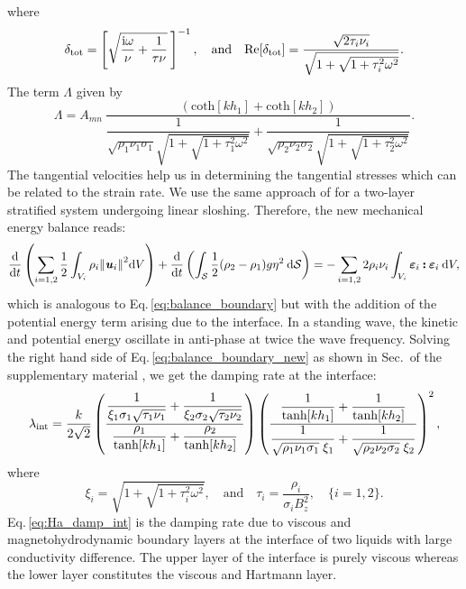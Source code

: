 \documentclass[aps,prfluids,reprint,superscriptaddress]{revtex4-2}
\newcommand{\h}[1]{\textbf{\textit{#1}}}
\newcommand{\ii}[1]{\text{#1}}
\newcommand{\RN}[1]{%
	\textup{\uppercase\expandafter{\romannumeral#1}}%
}
\begin{document}
where
\begin{equation}
	\delta_{\rm tot}=
	\left[
	\sqrt{\dfrac{\ii i\omega}{\nu} + \dfrac{1}{\tau\nu} }
	\:\right]^{-1},
	\quad  \ii{and}  \quad
	\ii{Re}[\delta_{\rm tot}] 
	=
	\frac{\sqrt{2\tau_i\nu_i}}{\sqrt{1+\sqrt{1+\tau_i^2\omega^2}}}.
\end{equation}
The term $\Lambda$ given by
\begin{equation}
	\Lambda = A_{mn}\:\frac{(\text{coth}[kh_1] + \text{coth}[kh_2]) }
	{
		\dfrac{1}{\sqrt{\rho_1\nu_1\sigma_1}
			\sqrt{1 + \sqrt{1 + \tau_1^2\omega^2} }  }
		+
		\dfrac{1}{\sqrt{\rho_2\nu_2\sigma_2}
			\sqrt{1 + \sqrt{1 + \tau_2^2\omega^2} }  }
	}.
\end{equation}
\indent The tangential velocities help us in determining the tangential stresses which can be related to the strain rate. We use the same approach of \citet{Hegde2026} for a two-layer stratified system undergoing linear sloshing. Therefore, the new mechanical energy balance reads:
\begin{equation}
	\dv{}{t}\left( \sum_{i=1,2} \frac{1}{2} 
	\int_{V_i} \rho_i \norm{\h u_i}^2 \mathrm dV  \right)
	+
	\dv{}{t}\left( \int_{\mathcal{S}} 
	\frac{1}{2} (\rho_2-\rho_1)g\eta^2  \: \mathrm d\mathcal{S}  
	\right)
	= -\sum_{i=1,2} 2\rho_i\nu_i
	\int_{V_i} \bm\varepsilon_i \bm{\mathbin{:}} \bm\varepsilon_i  \: \mathrm dV ,
	\label{eq:balance_boundary_new}
\end{equation}
which is analogous to Eq.\,\eqref{eq:balance_boundary} but with the addition of the potential energy term  arising due to the interface. In a standing wave, the kinetic and potential energy oscillate in anti-phase at twice the wave frequency. Solving the right hand side of Eq.\,\eqref{eq:balance_boundary_new} as shown in Sec.\,\RN{3} of the supplementary material \cite{SMmagdamp_hegde}, we get the damping rate at the interface:
\begin{equation}
	\lambda_{\rm int}=
	\frac{k}{2\sqrt{2}}
	\left(
	\frac{ \dfrac{1}{\xi_1\sigma_1\sqrt{\tau_1\nu_1}}
		+
		\dfrac{1}{\xi_2\sigma_2\sqrt{\tau_2\nu_2}} 
	}{ 
		\dfrac{\rho_1}{\text{tanh}[kh_1]} + \dfrac{\rho_2}{\text{tanh}[kh_2]} }
	\right)
	\left(
	\frac{
		\dfrac{1}{\text{tanh}[kh_1]} + \dfrac{1}{\text{tanh}[kh_2]} 
	}
	{
		\dfrac{1}{\sqrt{\rho_1\nu_1\sigma_1}\;\xi_1} + 
		\dfrac{1}{\sqrt{\rho_2\nu_2\sigma_2}\;\xi_2}
	}
	\right)^2,
	\label{eq:Ha_damp_int}
\end{equation}
where
\begin{equation}
	\xi_i = \sqrt{1 + \sqrt{1 + \tau_i^2\omega^2} }, \quad \ii{and} \quad
	\tau_i = \frac{\rho_i}{\sigma_iB_z^2},  \quad \{i=1,2\}.
\end{equation}
Eq.\,\eqref{eq:Ha_damp_int} is the damping rate due to viscous and magnetohydrodynamic boundary layers at the interface of two liquids with large conductivity difference. The upper layer of the interface is purely viscous whereas the lower layer constitutes the viscous and Hartmann layer.













\end{document}
